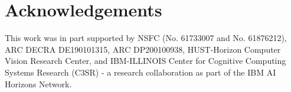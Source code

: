 \documentclass[10pt,journal,compsoc]{IEEEtran}
\begin{document}
\section*{Acknowledgements}
This work was in part supported by NSFC (No. 61733007 and No. 61876212), ARC DECRA DE190101315, ARC DP200100938, HUST-Horizon Computer Vision Research Center, and IBM-ILLINOIS Center
for Cognitive Computing Systems Research (C3SR) - a research collaboration as part of the IBM AI Horizons Network.




\ifCLASSOPTIONcaptionsoff
  \newpage
\fi







{\small
    
    
}
\end{document}
